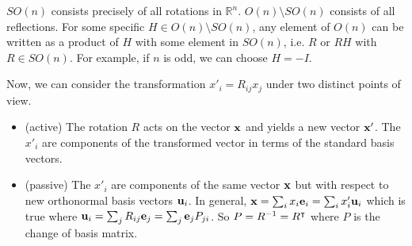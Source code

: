 \documentclass{article}
\begin{document}
$SO(n)$ consists precisely of all rotations in $\mathbb R^n$. $O(n) \setminus SO(n)$ consists of all reflections. For some specific $H \in O(n) \setminus SO(n)$, any element of $O(n)$ can be written as a product of $H$ with some element in $SO(n)$, i.e. $R$ or $RH$ with $R \in SO(n)$. For example, if $n$ is odd, we can choose $H = -I$.

Now, we can consider the transformation $x'_i = R_{ij} x_j$ under two distinct points of view.
\begin{itemize}
    \item (active) The rotation $R$ acts on the vector $\vb x$ and yields a new vector $\vb x'$. The $x'_i$ are components of the transformed vector in terms of the standard basis vectors.
    \item (passive) The $x'_i$ are components of the same vector $\vb x$ but with respect to new orthonormal basis vectors $\vb u_i$. In general, $\vb x = \sum_i x_i \vb e_i = \sum_i x'_i \vb u_i$ which is true where $\vb u_i = \sum_j R_{ij} \vb e_j = \sum_j \vb e_j P_{ji}$. So $P = R^{-1} = R^\intercal$ where $P$ is the change of basis matrix.
\end{itemize}
\end{document}
